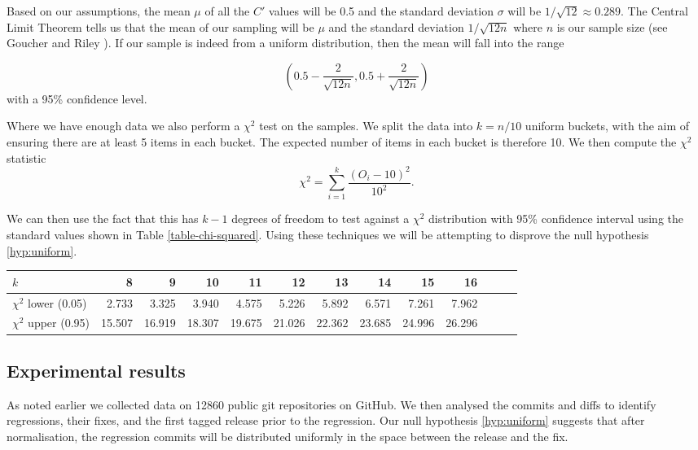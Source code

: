 \documentclass[10pt,journal,compsoc]{IEEEtran}
\begin{document}
Based on our assumptions, the mean $\mu$ of all the $C'$ values will be 0.5 and the standard deviation $\sigma$ will be $1 / \sqrt{12} \approx 0.289$. The Central Limit Theorem tells us that the mean of our sampling will be $\mu$ and the standard deviation $1 / \sqrt{12 n}$ where $n$ is our sample size (see Goucher and Riley \cite{goucher2009}). If our sample is indeed from a uniform distribution, then the mean will fall into the range

$$
\left( 0.5 - \frac{2}{\sqrt{12 n}}, 0.5 + \frac{2}{\sqrt{12 n}} \right)
$$
with a 95\% confidence level.

Where we have enough data we also perform a $\chi^2$ test on the samples. We split the data into $k = n / 10$ uniform buckets, with the aim of ensuring there are at least 5 items in each bucket. The expected number of items in each bucket is therefore 10. We then compute the $\chi^2$ statistic \cite{knuth2014}
$$
\chi^2 = \sum_{i = 1}^k \frac{(O_i - 10)^2}{10^2} .
$$

We can then use the fact that this has $k - 1$ degrees of freedom to test against a $\chi^2$ distribution with 95\% confidence interval using the standard values shown in Table \ref{table-chi-squared}. Using these techniques we will be attempting to disprove the null hypothesis \ref{hyp:uniform}.

\begin{table*}[t!]
\begin{center}
\begin{tabular}{l r r r r r r r r r r r r} \hline
$k$ & 8 & 9 & 10 & 11 & 12 & 13 & 14 & 15 & 16 \\ \hline
$\chi^2$ lower (0.05) & 2.733 & 3.325 & 3.940 & 4.575 & 5.226 & 5.892 & 6.571 & 7.261 & 7.962 \\
$\chi^2$ upper (0.95) & 15.507 & 16.919 & 18.307 & 19.675 & 21.026 & 22.362 & 23.685 & 24.996 & 26.296 \\ \hline
\end{tabular}
\caption{\label{table-chi-squared}$\chi^2$ distribution values for 95\% confidence.}
\end{center}
\end{table*}

\subsection{Experimental results}

As noted earlier we collected data on 12860 public git repositories on GitHub. We then analysed the commits and diffs to identify regressions, their fixes, and the first tagged release prior to the regression. Our null hypothesis \ref{hyp:uniform} suggests that after normalisation, the regression commits will be distributed uniformly in the space between the release and the fix.
\end{document}
